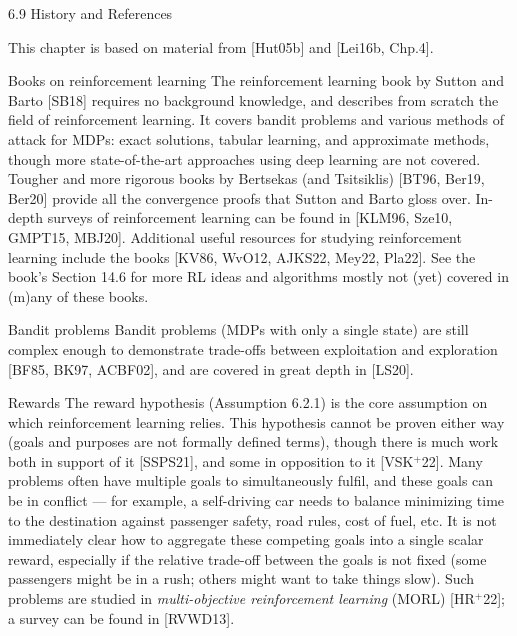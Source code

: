 \documentclass[aspectratio=169,10pt]{beamer}
\begin{document}
\begin{frame}[allowframebreaks]{6.9 History and References}

This chapter is based on material from [Hut05b] and [Lei16b, Chp.4].

\begin{block}{Books on reinforcement learning}
The reinforcement learning book by Sutton and Barto [SB18] requires no
background knowledge, and describes from scratch the field of
reinforcement learning. It covers bandit problems and various methods of
attack for MDPs: exact solutions, tabular learning, and approximate
methods, though more state-of-the-art approaches using deep learning are
not covered. Tougher and more rigorous books by Bertsekas (and Tsitsiklis)
[BT96, Ber19, Ber20] provide all the convergence proofs that Sutton and
Barto gloss over. In-depth surveys of reinforcement learning can be found
in [KLM96, Sze10, GMPT15, MBJ20]. Additional useful resources for studying
reinforcement learning include the books [KV86, WvO12, AJKS22, Mey22,
Pla22]. See the book's Section 14.6 for more RL ideas and algorithms mostly
not (yet) covered in (m)any of these books.
\end{block}

\begin{block}{Bandit problems}
Bandit problems (MDPs with only a single state) are still complex enough to
demonstrate trade-offs between exploitation and exploration [BF85, BK97,
ACBF02], and are covered in great depth in [LS20].
\end{block}

\framebreak

\begin{block}{Rewards}
The reward hypothesis (Assumption 6.2.1) is the core assumption on which
reinforcement learning relies. This hypothesis cannot be proven either way
(goals and purposes are not formally defined terms), though there is much
work both in support of it [SSPS21], and some in opposition to it
[VSK$^{+}$22]. Many problems often have multiple goals to simultaneously
fulfil, and these goals can be in conflict --- for example, a self-driving
car needs to balance minimizing time to the destination against passenger
safety, road rules, cost of fuel, etc. It is not immediately clear how to
aggregate these competing goals into a single scalar reward, especially if
the relative trade-off between the goals is not fixed (some passengers
might be in a rush; others might want to take things slow). Such problems
are studied in \emph{multi-objective reinforcement learning} (MORL)
[HR$^{+}$22]; a survey can be found in [RVWD13].
\end{block}


\end{frame}
\end{document}
